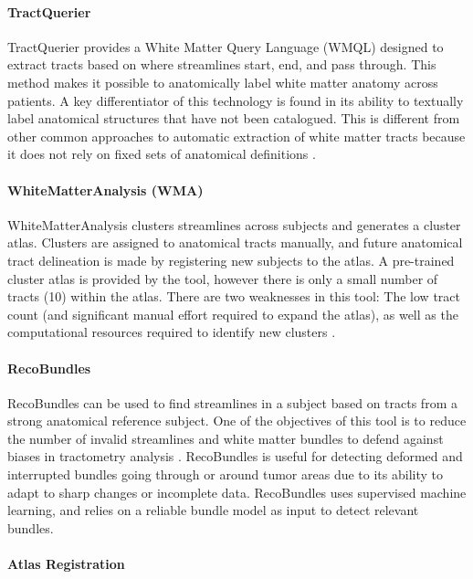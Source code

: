 \paragraph {TractQuerier}

TractQuerier provides a White Matter Query Language (WMQL) designed to extract 
tracts based on where streamlines start, end, and pass through.  This method 
makes it possible to anatomically label white matter anatomy across patients.  
A key differentiator of this technology is found in its ability to textually 
label anatomical structures that have not been catalogued.  This is different 
from other common approaches to automatic extraction of white matter 
tracts because it does not rely on fixed sets of anatomical definitions 
\cite {wasserman}.

\paragraph {WhiteMatterAnalysis (WMA)}

WhiteMatterAnalysis clusters streamlines across subjects and generates a cluster 
atlas.  Clusters are assigned to anatomical tracts manually, and future 
anatomical tract delineation is made by registering new subjects to the atlas.  
A pre-trained cluster atlas is provided by the tool, however there is only a 
small number of tracts (10) within the atlas.  There are two weaknesses in this 
tool:  The low tract count (and significant manual effort required to expand the 
atlas), as well as the computational resources required to identify new clusters
\cite {odonnell}.

\paragraph {RecoBundles}

RecoBundles can be used to find streamlines in a subject based on tracts from a 
strong anatomical reference subject.  One of the objectives of this tool is to 
reduce the number of invalid streamlines and white matter bundles to defend 
against biases in tractometry analysis \cite {garyfallidis}.  RecoBundles is 
useful for detecting deformed and interrupted bundles going through or around 
tumor areas due to its ability to adapt to sharp changes or incomplete data.  
RecoBundles uses supervised machine learning,  and relies on a reliable bundle 
model as input to detect relevant bundles.

\paragraph {Atlas Registration}

